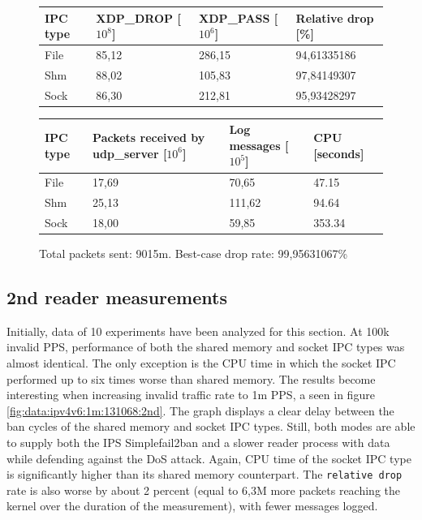 \begin{figure}[!h]
	\centering
	\scriptsize
	\begin{tabular}{llll}
		\toprule
		\textbf{IPC type} & \textbf{XDP\_DROP [$10^8$]} & \textbf{XDP\_PASS [$10^6$]} & \textbf{Relative drop [\%]} \\ \midrule 
		File & 85,12 & 286,15 & 94,61335186 \\
        Shm & 88,02 & 105,83 & 97,84149307 \\
        Sock & 86,30 & 212,81 & 95,93428297 \\
	\bottomrule
	\end{tabular}
    \begin{tabular}{llll}
		\toprule
		\textbf{IPC type} & \textbf{Packets received by udp\_server [$10^6$]} & \textbf{Log messages [$10^5$]} & \textbf{CPU [seconds]} \\ \midrule 
		File & 17,69 & 70,65 & 47.15 \\
        Shm & 25,13 & 111,62 & 94.64 \\
        Sock & 18,00 & 59,85 & 353.34 \\
	\bottomrule
	\end{tabular}
	\caption[Simplefail2ban, IPv4v6, 30m \ac{PPS}, 131068 malicious clients]{Total packets sent: 9015m. Best-case drop rate: 99,95631067\%}
	\label{fig:data:ipv4v6:30m:131068}
\end{figure}

\subsection{2nd reader measurements}
Initially, data of 10 experiments have been analyzed for this section.
At 100k invalid \ac{PPS}, performance of both the shared memory and socket \ac{IPC} types was almost identical.
The only exception is the \ac{CPU} time in which the socket \ac{IPC} performed up to six times worse than shared memory.
The results become interesting when increasing invalid traffic rate to 1m \ac{PPS}, a seen in figure \ref{fig:data:ipv4v6:1m:131068:2nd}.
The graph displays a clear delay between the ban cycles of the shared memory and socket \ac{IPC} types.
Still, both modes are able to supply both the \ac{IPS} Simplefail2ban and a slower reader process with data while defending against the \ac{DoS} attack.
Again, \ac{CPU} time of the socket \ac{IPC} type is significantly higher than its shared memory counterpart.
The \texttt{relative drop} rate is also worse by about 2 percent (equal to 6,3M more packets reaching the kernel over the duration of the measurement), with fewer messages logged.

